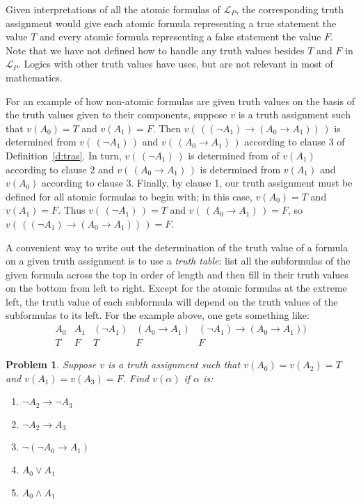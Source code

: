 \documentclass[12pt]{amsbook}
\theoremstyle{plain}
\newtheorem{prob}[thm]{Problem}
\theoremstyle{definition}
\theoremstyle{remark}
\begin{document}
Given interpretations of all the atomic formulas of $\mathcal{L}_P$,  the corresponding truth assignment would give each atomic formula representing a true statement the value $T$ and every atomic formula representing a false statement the value $F$.  Note that we have not defined how to handle any truth values besides $T$ and $F$ in $\mathcal{L}_P$.  Logics with other truth values have uses,  but are not relevant in most of mathematics.

For an example of how non-atomic formulas are given truth values on the basis of the truth values given to their components, suppose $v$ is a truth assignment such that $v(A_0) = T$ and $v(A_1) = F$. Then $v(\, ((\lnot A_1) \to (A_0 \to A_1))\, )$ is determined from $v(\, (\lnot A_1)\, )$ and $v(\, (A_0 \to A_1)\, )$ according to clause 3 of Definition~\ref{d:tras}.  In turn,  $v(\, (\lnot A_1)\, )$ is determined from of $v(A_1)$ according to clause 2 and $v(\, (A_0 \to A_1)\, )$ is determined from $v(A_1)$ and $v(A_0)$ according to clause 3.  Finally,  by clause 1,  our truth assignment must be defined for all atomic formulas to begin with;  in this case,  $v(A_0) = T$ and $v(A_1) = F$.  Thus $v(\, (\lnot A_1)\, ) = T$ and $v(\, (A_0 \to A_1)\, ) = F$,  so $v(\, ((\lnot A_1) \to (A_0 \to A_1))\, ) = F$.

A convenient way to write out the determination of the truth value of a formula on a given truth assignment is to use a {\em truth table\/}:  list all the subformulas of the given formula across the top in order of length and then fill in their truth values on the bottom from left to right.  Except for the atomic formulas at the extreme left,  the truth value of each subformula will depend on the truth values of the subformulas to its left.  For the example above,  one gets something like: 
\[\begin{array}{c|c|c|c|c}
A_0 & A_1 & (\lnot A_1) & (A_0 \to A_1) & (\lnot A_1) \to (A_0 \to A_1)) \\ \hline
T & F & T & F & F
\end{array}\]

\begin{prob} \label{p:two1}
Suppose $v$ is a truth assignment such that $v(A_0) = v(A_2) = T$ and $v(A_1) = v(A_3) = F$.  Find $v(\alpha)$ if $\alpha$ is:
\begin{enumerate}
\item $\lnot A_2 \to \lnot A_3$
\item $\lnot A_2 \to A_3$
\item $\lnot ( \lnot A_0 \to A_1)$
\item $A_0 \lor A_1$
\item $A_0 \land A_1$
\end{enumerate}
\end{prob}
\end{document}
